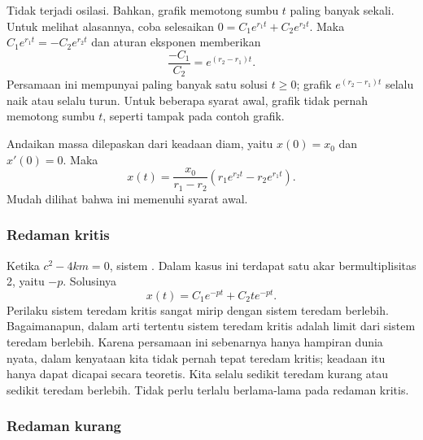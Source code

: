 Tidak terjadi osilasi. Bahkan, grafik memotong sumbu $t$ paling banyak sekali. Untuk melihat alasannya, coba selesaikan $0 = C_1 e^{r_1 t} + C_2 e^{r_2 t}$. Maka $C_1 e^{r_1 t} = - C_2 e^{r_2 t}$ dan aturan eksponen memberikan
\begin{equation*}
\frac{-C_1}{C_2} = e^{(r_2-r_1) t} .
\end{equation*}
Persamaan ini mempunyai paling banyak satu solusi $t \geq 0$; grafik $e^{(r_2-r_1) t}$ selalu naik atau selalu turun. Untuk beberapa syarat awal, grafik tidak pernah memotong sumbu $t$, seperti tampak pada contoh grafik.

\begin{example}
Andaikan massa dilepaskan dari keadaan diam, yaitu $x(0) = x_0$ dan $x'(0) = 0$. Maka
\begin{equation*}
x(t) = \frac{x_0}{r_1-r_2} \left(r_1 e^{r_2 t} - r_2 e^{r_1 t} \right) .
\end{equation*}
Mudah dilihat bahwa ini memenuhi syarat awal.
\end{example}

\subsubsection{Redaman kritis}

Ketika $c^2 - 4km = 0$, sistem \emph{}. Dalam kasus ini terdapat satu akar bermultiplisitas 2, yaitu $-p$. Solusinya
\begin{equation*}
x(t) = C_1 e^{-pt} + C_2 t e^{-pt} .
\end{equation*}
Perilaku sistem teredam kritis sangat mirip dengan sistem teredam berlebih. Bagaimanapun, dalam arti tertentu sistem teredam kritis adalah limit dari sistem teredam berlebih. Karena persamaan ini sebenarnya hanya hampiran dunia nyata, dalam kenyataan kita tidak pernah tepat teredam kritis; keadaan itu hanya dapat dicapai secara teoretis. Kita selalu sedikit teredam kurang atau sedikit teredam berlebih. Tidak perlu terlalu berlama-lama pada redaman kritis.

\subsubsection{Redaman kurang}

